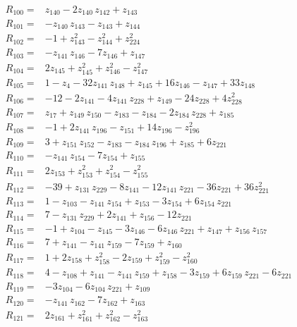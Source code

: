 \begin{align*}
R_{100}={}& z_{140} - 2z_{140}\,z_{142} + z_{143} \\[2pt]
R_{101}={}& -z_{140}\,z_{143} - z_{143} + z_{144} \\[2pt]
R_{102}={}& -1 + z_{143}^{2} - z_{144}^{2} + z_{224}^{2} \\[2pt]
R_{103}={}& -z_{141}\,z_{146} - 7z_{146} + z_{147} \\[2pt]
R_{104}={}& 2z_{145} + z_{145}^{2} + z_{146}^{2} - z_{147}^{2} \\[2pt]
R_{105}={}& 1 - z_{4} - 32z_{141}\,z_{148} + z_{145} + 16z_{146} - z_{147} + 33z_{148} \\[2pt]
R_{106}={}& -12 - 2z_{141} - 4z_{141}\,z_{228} + z_{149} - 24z_{228} + 4z_{228}^{2} \\[2pt]
R_{107}={}& z_{17} + z_{149}\,z_{150} - z_{183} - z_{184} - 2z_{184}\,z_{228} + z_{185} \\[2pt]
R_{108}={}& -1 + 2z_{141}\,z_{196} - z_{151} + 14z_{196} - z_{196}^{2} \\[2pt]
R_{109}={}& 3 + z_{151}\,z_{152} - z_{183} - z_{184}\,z_{196} + z_{185} + 6z_{221} \\[2pt]
R_{110}={}& -z_{141}\,z_{154} - 7z_{154} + z_{155} \\[2pt]
R_{111}={}& 2z_{153} + z_{153}^{2} + z_{154}^{2} - z_{155}^{2} \\[2pt]
R_{112}={}& -39 + z_{131}\,z_{229} - 8z_{141} - 12z_{141}\,z_{221} - 36z_{221} + 36z_{221}^{2} \\[2pt]
R_{113}={}& 1 - z_{103} - z_{141}\,z_{154} + z_{153} - 3z_{154} + 6z_{154}\,z_{221} \\[2pt]
R_{114}={}& 7 - z_{131}\,z_{229} + 2z_{141} + z_{156} - 12z_{221} \\[2pt]
R_{115}={}& -1 + z_{104} - z_{145} - 3z_{146} - 6z_{146}\,z_{221} + z_{147} + z_{156}\,z_{157} \\[2pt]
R_{116}={}& 7 + z_{141} - z_{141}\,z_{159} - 7z_{159} + z_{160} \\[2pt]
R_{117}={}& 1 + 2z_{158} + z_{158}^{2} - 2z_{159} + z_{159}^{2} - z_{160}^{2} \\[2pt]
R_{118}={}& 4 - z_{108} + z_{141} - z_{141}\,z_{159} + z_{158} - 3z_{159} + 6z_{159}\,z_{221} - 6z_{221} \\[2pt]
R_{119}={}& -3z_{104} - 6z_{104}\,z_{221} + z_{109} \\[2pt]
R_{120}={}& -z_{141}\,z_{162} - 7z_{162} + z_{163} \\[2pt]
R_{121}={}& 2z_{161} + z_{161}^{2} + z_{162}^{2} - z_{163}^{2} \\[2pt]

\end{align*}
